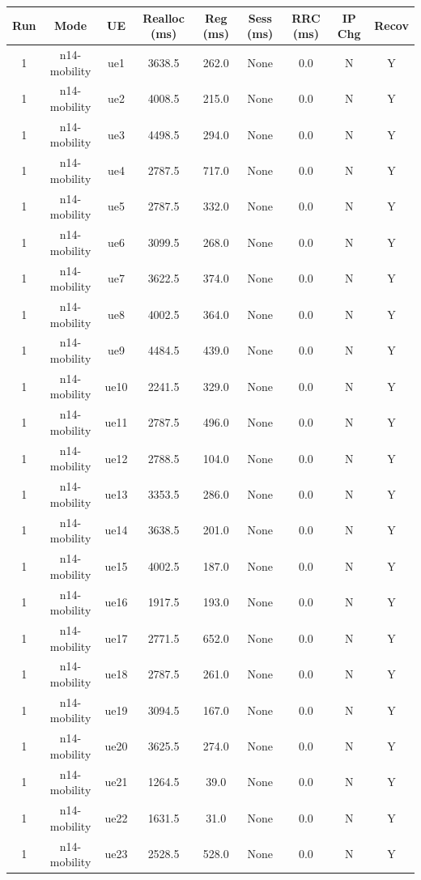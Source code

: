 \begin{table}[ht]
\centering
\begin{tabular}{|c|c|c|c|c|c|c|c|c|}
\hline
Run & Mode & UE & Realloc (ms) & Reg (ms) & Sess (ms) & RRC (ms) & IP Chg & Recov \\
\hline
1 & n14-mobility & ue1 & 3638.5 & 262.0 & None & 0.0 & N & Y \\
1 & n14-mobility & ue2 & 4008.5 & 215.0 & None & 0.0 & N & Y \\
1 & n14-mobility & ue3 & 4498.5 & 294.0 & None & 0.0 & N & Y \\
1 & n14-mobility & ue4 & 2787.5 & 717.0 & None & 0.0 & N & Y \\
1 & n14-mobility & ue5 & 2787.5 & 332.0 & None & 0.0 & N & Y \\
1 & n14-mobility & ue6 & 3099.5 & 268.0 & None & 0.0 & N & Y \\
1 & n14-mobility & ue7 & 3622.5 & 374.0 & None & 0.0 & N & Y \\
1 & n14-mobility & ue8 & 4002.5 & 364.0 & None & 0.0 & N & Y \\
1 & n14-mobility & ue9 & 4484.5 & 439.0 & None & 0.0 & N & Y \\
1 & n14-mobility & ue10 & 2241.5 & 329.0 & None & 0.0 & N & Y \\
1 & n14-mobility & ue11 & 2787.5 & 496.0 & None & 0.0 & N & Y \\
1 & n14-mobility & ue12 & 2788.5 & 104.0 & None & 0.0 & N & Y \\
1 & n14-mobility & ue13 & 3353.5 & 286.0 & None & 0.0 & N & Y \\
1 & n14-mobility & ue14 & 3638.5 & 201.0 & None & 0.0 & N & Y \\
1 & n14-mobility & ue15 & 4002.5 & 187.0 & None & 0.0 & N & Y \\
1 & n14-mobility & ue16 & 1917.5 & 193.0 & None & 0.0 & N & Y \\
1 & n14-mobility & ue17 & 2771.5 & 652.0 & None & 0.0 & N & Y \\
1 & n14-mobility & ue18 & 2787.5 & 261.0 & None & 0.0 & N & Y \\
1 & n14-mobility & ue19 & 3094.5 & 167.0 & None & 0.0 & N & Y \\
1 & n14-mobility & ue20 & 3625.5 & 274.0 & None & 0.0 & N & Y \\
1 & n14-mobility & ue21 & 1264.5 & 39.0 & None & 0.0 & N & Y \\
1 & n14-mobility & ue22 & 1631.5 & 31.0 & None & 0.0 & N & Y \\
1 & n14-mobility & ue23 & 2528.5 & 528.0 & None & 0.0 & N & Y \\

\end{tabular}
\end{table}

